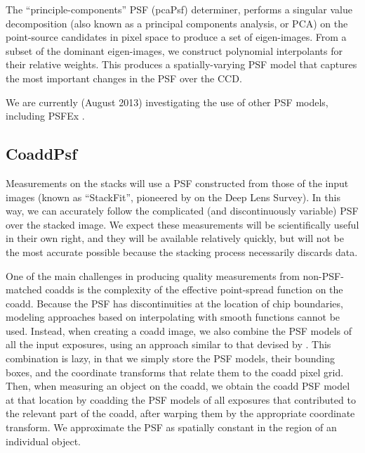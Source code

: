 \documentclass[12pt]{article}
\begin{document}
The ``principle-components'' PSF (pcaPsf) determiner, performs a singular value decomposition (also known as a
principal components analysis, or PCA) on the point-source candidates in pixel space to produce a set of
eigen-images.  From a subset of the dominant eigen-images, we construct polynomial interpolants for their
relative weights.  This produces a spatially-varying PSF model that captures the most important changes in the
PSF over the CCD.

We are currently (August 2013) investigating the use of other PSF models, including PSFEx
\citep{2011ASPC..442..435B}.


\subsection{CoaddPsf}
\label{alg:coaddPsf}

Measurements on the stacks will use a PSF constructed from those of the input images (known as ``StackFit'',
pioneered by \citealt{2012arXiv1210.2732J} on the Deep Lens Survey).  In this way, we can accurately follow
the complicated (and discontinuously variable) PSF over the stacked image.  We expect these measurements will
be scientifically useful in their own right, and they will be available relatively quickly, but will not be
the most accurate possible because the stacking process necessarily discards data.

One of the main challenges in producing quality measurements from
non-PSF-matched coadds is the complexity of the effective point-spread
function on the coadd.  Because the PSF has discontinuities at the
location of chip boundaries, modeling approaches based on
interpolating with smooth functions cannot be used.  Instead, when
creating a coadd image, we also combine the PSF models of all the
input exposures, using an approach similar to that devised by
\cite{JT2011}.  This combination is lazy, in that we simply store the
PSF models, their bounding boxes, and the coordinate transforms that
relate them to the coadd pixel grid.  Then, when measuring an object
on the coadd, we obtain the coadd PSF model at that location by coadding the
PSF models of all exposures that contributed to the relevant part of
the coadd, after warping them by the appropriate coordinate
transform.  We approximate the PSF as spatially constant in the region
of an individual object.
\end{document}
